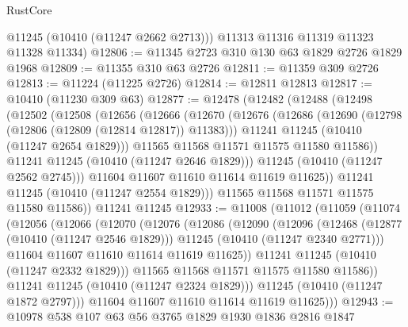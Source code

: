 \begin{lexlean}{RustCore}
\begin{coremodule}
        @11245
        (@10410 (@11247 @2662 @2713)))
      @11313
      @11316
      @11319
      @11323
      @11328
      @11334)
@12806 := @11345 @2723 @310 @130 @63 @1829 @2726 @1829 @1968
@12809 := @11355 @310 @63 @2726
@12811 := @11359 @309 @2726
@12813 := @11224 (@11225 @2726)
@12814 := @12811 @12813
@12817 := @10410 (@11230 @309 @63)
@12877 := @12478
    (@12482
      (@12488
        (@12498
          (@12502
            (@12508
              (@12656
                (@12666
                  (@12670
                    (@12676
                      (@12686
                        (@12690 (@12798 (@12806 (@12809 (@12814 @12817)) @11383)))
                        @11241
                        @11245
                        (@10410 (@11247 @2654 @1829)))
                      @11565
                      @11568
                      @11571
                      @11575
                      @11580
                      @11586))
                  @11241
                  @11245
                  (@10410 (@11247 @2646 @1829)))
                @11245
                (@10410 (@11247 @2562 @2745)))
              @11604
              @11607
              @11610
              @11614
              @11619
              @11625))
          @11241
          @11245
          (@10410 (@11247 @2554 @1829)))
        @11565
        @11568
        @11571
        @11575
        @11580
        @11586))
    @11241
    @11245
@12933 := @11008
    (@11012
      (@11059
        (@11074
          (@12056
            (@12066
              (@12070
                (@12076
                  (@12086
                    (@12090
                      (@12096
                        (@12468
                          (@12877 (@10410 (@11247 @2546 @1829)))
                          @11245
                          (@10410 (@11247 @2340 @2771)))
                        @11604
                        @11607
                        @11610
                        @11614
                        @11619
                        @11625))
                    @11241
                    @11245
                    (@10410 (@11247 @2332 @1829)))
                  @11565
                  @11568
                  @11571
                  @11575
                  @11580
                  @11586))
              @11241
              @11245
              (@10410 (@11247 @2324 @1829)))
            @11245
            (@10410 (@11247 @1872 @2797)))
          @11604
          @11607
          @11610
          @11614
          @11619
          @11625)))
@12943 := @10978 @538 @107 @63 @56 @3765 @1829 @1930 @1836 @2816 @1847

\end{coremodule}
\end{lexlean}
